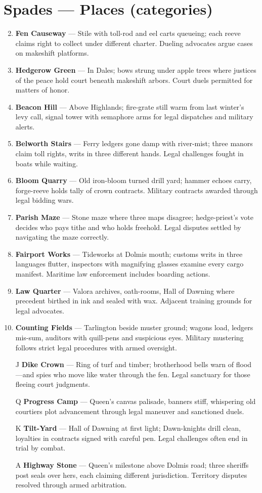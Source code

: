 \section*{Spades --- Places (categories)}
\label{sec:viterra-places}
\begin{enumerate}
\setcounter{enumi}{1}
\item \textbf{Fen Causeway} --- Stile with toll-rod and eel carts queueing; each reeve claims right to collect under different charter. Dueling advocates argue cases on makeshift platforms.
\item \textbf{Hedgerow Green} --- In Dales; bows strung under apple trees where justices of the peace hold court beneath makeshift arbors. Court duels permitted for matters of honor.
\item \textbf{Beacon Hill} --- Above Highlands; fire-grate still warm from last winter's levy call, signal tower with semaphore arms for legal dispatches and military alerts.
\item \textbf{Belworth Stairs} --- Ferry ledgers gone damp with river-mist; three manors claim toll rights, writs in three different hands. Legal challenges fought in boats while waiting.
\item \textbf{Bloom Quarry} --- Old iron-bloom turned drill yard; hammer echoes carry, forge-reeve holds tally of crown contracts. Military contracts awarded through legal bidding wars.
\item \textbf{Parish Maze} --- Stone maze where three maps disagree; hedge-priest's vote decides who pays tithe and who holds freehold. Legal disputes settled by navigating the maze correctly.
\item \textbf{Fairport Works} --- Tideworks at Dolmis mouth; customs writs in three languages flutter, inspectors with magnifying glasses examine every cargo manifest. Maritime law enforcement includes boarding actions.
\item \textbf{Law Quarter} --- Valora archives, oath-rooms, Hall of Dawning where precedent birthed in ink and sealed with wax. Adjacent training grounds for legal advocates.
\item \textbf{Counting Fields} --- Tarlington beside muster ground; wagons load, ledgers mis-sum, auditors with quill-pens and suspicious eyes. Military mustering follows strict legal procedures with armed oversight.
\item[J] \textbf{Dike Crown} --- Ring of turf and timber; brotherhood bells warn of flood—and spies who move like water through the fen. Legal sanctuary for those fleeing court judgments.
\item[Q] \textbf{Progress Camp} --- Queen's canvas palisade, banners stiff, whispering old courtiers plot advancement through legal maneuver and sanctioned duels.
\item[K] \textbf{Tilt-Yard} --- Hall of Dawning at first light; Dawn-knights drill clean, loyalties in contracts signed with careful pen. Legal challenges often end in trial by combat.
\item[A] \textbf{Highway Stone} --- Queen's milestone above Dolmis road; three sheriffs post seals over hers, each claiming different jurisdiction. Territory disputes resolved through armed arbitration.
\end{enumerate}

